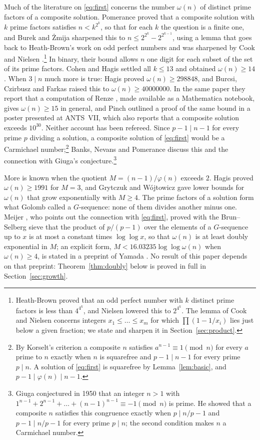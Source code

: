\documentclass[11pt,reqno]{amsart}
\numberwithin{equation}{section}
\theoremstyle{plain}
\theoremstyle{definition}
\theoremstyle{remark}
\begin{document}
Much of the literature on \eqref{eq:first} concerns the number
$\omega(n)$ of distinct prime factors of a composite solution.
Pomerance \cite{Pom77} proved that a composite solution with $k$ prime
factors satisfies $n<k^{2^k}$, so that for each $k$ the question is a
finite one, and Burek and \.Zmija \cite{BZ19} sharpened this to
$n\le2^{2^k}-2^{2^{k-1}}$, using a lemma that goes back to
Heath-Brown's work on odd perfect numbers \cite{HB94} and was
sharpened by Cook \cite{Coo99} and Nielsen \cite{Nie03}.\footnote{Heath-Brown
proved that an odd perfect number with $k$ distinct prime factors is
less than $4^{4^k}$, and Nielsen lowered this to $2^{4^k}$. The lemma
of Cook and Nielsen concerns integers $x_1\le\dots\le x_m$ for which
$\prod(1-1/x_i)$ lies just below a given fraction; we state and
sharpen it in Section~\ref{sec:product}.} In binary,
their bound allows $n$ one digit for each subset of the set of its
prime factors. Cohen and Hagis \cite{CH80} settled all $k\le13$ and
obtained $\omega(n)\ge14$. When $3\mid n$ much more is true: Hagis
\cite{Hag88} proved $\omega(n)\ge298848$, and Burcsi, Czirbusz and
Farkas \cite{BCF11} raised this to $\omega(n)\ge40000000$. In the same
paper they report that a computation of Renze \cite{Ren04}, made
available as a Mathematica notebook, gives $\omega(n)\ge15$ in general,
and Pinch \cite{Pin06} outlined a proof of the same bound in a poster
presented at ANTS~VII, which also reports that a composite solution
exceeds $10^{30}$. Neither account has been refereed. Since $p-1\mid n-1$ for every prime
$p$ dividing a solution, a composite solution of \eqref{eq:first}
would be a Carmichael number;\footnote{By Korselt's criterion a
composite $n$ satisfies $a^{n-1}\equiv1\pmod n$ for every $a$ prime to
$n$ exactly when $n$ is squarefree and $p-1\mid n-1$ for every prime
$p\mid n$. A solution of \eqref{eq:first} is squarefree by
Lemma~\ref{lem:basic}, and $p-1\mid\varphi(n)\mid n-1$.} Banks, Nevans and Pomerance \cite{BNP09}
discuss this and the connection with Giuga's conjecture.\footnote{Giuga
conjectured in 1950 that an integer $n>1$ with
$1^{n-1}+2^{n-1}+\dots+(n-1)^{n-1}\equiv-1\pmod n$ is prime. He showed
that a composite $n$ satisfies this congruence exactly when
$p\mid n/p-1$ and $p-1\mid n/p-1$ for every prime $p\mid n$; the second
condition makes $n$ a Carmichael number.}

More is known when the quotient $M=(n-1)/\varphi(n)$ exceeds $2$.
Hagis \cite{Hag88} proved $\omega(n)\ge1991$ for $M=3$, and Grytczuk
and W\'ojtowicz \cite{GW03} gave lower bounds for $\omega(n)$ that
grow exponentially with $M\ge4$. The prime
factors of a solution form what Golomb \cite{Gol55} called a
$G$-sequence: none of them divides another minus one. Meijer
\cite{Mei74}, who points out the connection with \eqref{eq:first},
proved with the Brun--Selberg sieve that the product of $p/(p-1)$ over
the elements of a $G$-sequence up to $x$ is at most a constant times
$\log\log x$, so that $\omega(n)$ is at least doubly exponential in
$M$; an explicit form, $M<16.03235\log\log\omega(n)$ when
$\omega(n)\ge4$, is stated in a preprint of Yamada \cite{Yam23}. No
result of this paper depends on that preprint: Theorem~\ref{thm:doubly}
below is proved in full in Section~\ref{sec:growth}.
\end{document}
